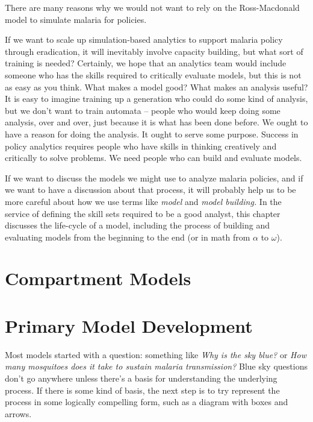 \documentclass[
]{book}
\begin{document}
There are many reasons why we would not want to rely on the Ross-Macdonald model to simulate malaria for policies.

If we want to scale up simulation-based analytics to support malaria policy through eradication, it will inevitably involve capacity building, but what sort of training is needed? Certainly, we hope that an analytics team would include someone who has the skills required to critically evaluate models, but this is not as easy as you think. What makes a model good? What makes an analysis useful? It is easy to imagine training up a generation who could do some kind of analysis, but we don't want to train automata -- people who would keep doing some analysis, over and over, just because it is what has been done before. We ought to have a reason for doing the analysis. It ought to serve some purpose. Success in policy analytics requires people who have skills in thinking creatively and critically to solve problems. We need people who can build and evaluate models.

If we want to discuss the models we might use to analyze malaria policies, and if we want to have a discussion about that process, it will probably help us to be more careful about how we use terms like \emph{model} and \emph{model building.} In the service of defining the skill sets required to be a good analyst, this chapter discusses the life-cycle of a model, including the process of building and evaluating models from the beginning to the end (or in math from \(\alpha\) to \(\omega\)).

\section{Compartment Models}\label{compartment-models}

\section{}\label{section}

\section{Primary Model Development}\label{primary-model-development}

Most models started with a question: something like \emph{Why is the sky blue?} or \emph{How many mosquitoes does it take to sustain malaria transmission?} Blue sky questions don't go anywhere unless there's a basis for understanding the underlying process. If there is some kind of basis, the next step is to try represent the process in some logically compelling form, such as a diagram with boxes and arrows.
\end{document}
